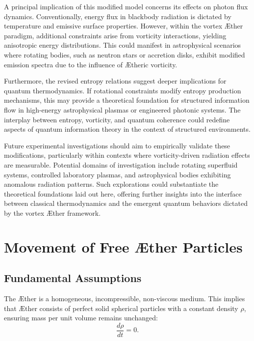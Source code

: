 \documentclass[a4paper,10pt]{article}
\begin{document}
A principal implication of this modified model concerns its effects on photon flux dynamics. Conventionally, energy flux in blackbody radiation is dictated by temperature and emissive surface properties. However, within the vortex Æther paradigm, additional constraints arise from vorticity interactions, yielding anisotropic energy distributions. This could manifest in astrophysical scenarios where rotating bodies, such as neutron stars or accretion disks, exhibit modified emission spectra due to the influence of Ætheric vorticity.


Furthermore, the revised entropy relations suggest deeper implications for quantum thermodynamics. If rotational constraints modify entropy production mechanisms, this may provide a theoretical foundation for structured information flow in high-energy astrophysical plasmas or engineered photonic systems. The interplay between entropy, vorticity, and quantum coherence could redefine aspects of quantum information theory in the context of structured environments.


Future experimental investigations should aim to empirically validate these modifications, particularly within contexts where vorticity-driven radiation effects are measurable. Potential domains of investigation include rotating superfluid systems, controlled laboratory plasmas, and astrophysical bodies exhibiting anomalous radiation patterns. Such explorations could substantiate the theoretical foundations laid out here, offering further insights into the interface between classical thermodynamics and the emergent quantum behaviors dictated by the vortex Æther framework.



    \newpage 

    \section{Movement of Free Æther Particles}

    \subsection*{Fundamental Assumptions}
    The Æther is a homogeneous, incompressible, non-viscous medium. This implies that Æther consists of perfect solid spherical particles with a constant density $\rho$, ensuring mass per unit volume remains unchanged:
    \begin{equation*}
        \frac{d \rho}{d t} = 0.
    \end{equation*}
\end{document}
